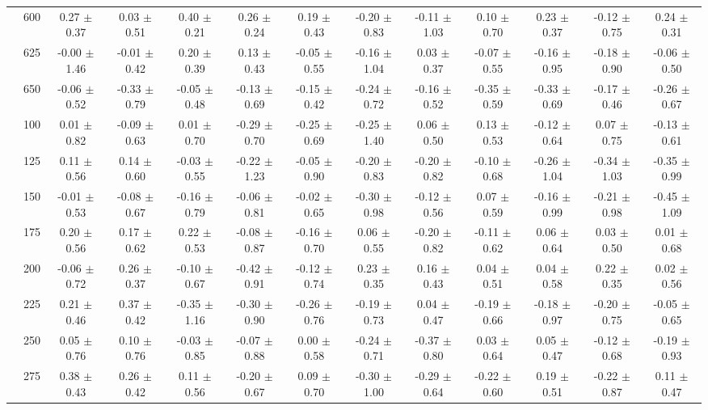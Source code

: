 \begin{table}[h]
{\begin{tabular}{
        ccccccccccccc}
 & 600& 0.27 $\pm$ 0.37& 0.03 $\pm$ 0.51& 0.40 $\pm$ 0.21& 0.26 $\pm$ 0.24& 0.19 $\pm$ 0.43& -0.20 $\pm$ 0.83& -0.11 $\pm$ 1.03& 0.10 $\pm$ 0.70& 0.23 $\pm$ 0.37& -0.12 $\pm$ 0.75& 0.24 $\pm$ 0.31 \\ 
 & 625& -0.00 $\pm$ 1.46& -0.01 $\pm$ 0.42& 0.20 $\pm$ 0.39& 0.13 $\pm$ 0.43& -0.05 $\pm$ 0.55& -0.16 $\pm$ 1.04& 0.03 $\pm$ 0.37& -0.07 $\pm$ 0.55& -0.16 $\pm$ 0.95& -0.18 $\pm$ 0.90& -0.06 $\pm$ 0.50 \\ 
 & 650& -0.06 $\pm$ 0.52& -0.33 $\pm$ 0.79& -0.05 $\pm$ 0.48& -0.13 $\pm$ 0.69& -0.15 $\pm$ 0.42& -0.24 $\pm$ 0.72& -0.16 $\pm$ 0.52& -0.35 $\pm$ 0.59& -0.33 $\pm$ 0.69& -0.17 $\pm$ 0.46& -0.26 $\pm$ 0.67 \\ \hline 
 & 100& 0.01 $\pm$ 0.82& -0.09 $\pm$ 0.63& 0.01 $\pm$ 0.70& -0.29 $\pm$ 0.70& -0.25 $\pm$ 0.69& -0.25 $\pm$ 1.40& 0.06 $\pm$ 0.50& 0.13 $\pm$ 0.53& -0.12 $\pm$ 0.64& 0.07 $\pm$ 0.75& -0.13 $\pm$ 0.61 \\ 
 & 125& 0.11 $\pm$ 0.56& 0.14 $\pm$ 0.60& -0.03 $\pm$ 0.55& -0.22 $\pm$ 1.23& -0.05 $\pm$ 0.90& -0.20 $\pm$ 0.83& -0.20 $\pm$ 0.82& -0.10 $\pm$ 0.68& -0.26 $\pm$ 1.04& -0.34 $\pm$ 1.03& -0.35 $\pm$ 0.99 \\ 
 & 150& -0.01 $\pm$ 0.53& -0.08 $\pm$ 0.67& -0.16 $\pm$ 0.79& -0.06 $\pm$ 0.81& -0.02 $\pm$ 0.65& -0.30 $\pm$ 0.98& -0.12 $\pm$ 0.56& 0.07 $\pm$ 0.59& -0.16 $\pm$ 0.99& -0.21 $\pm$ 0.98& -0.45 $\pm$ 1.09 \\ 
 & 175& 0.20 $\pm$ 0.56& 0.17 $\pm$ 0.62& 0.22 $\pm$ 0.53& -0.08 $\pm$ 0.87& -0.16 $\pm$ 0.70& 0.06 $\pm$ 0.55& -0.20 $\pm$ 0.82& -0.11 $\pm$ 0.62& 0.06 $\pm$ 0.64& 0.03 $\pm$ 0.50& 0.01 $\pm$ 0.68 \\ 
 & 200& -0.06 $\pm$ 0.72& 0.26 $\pm$ 0.37& -0.10 $\pm$ 0.67& -0.42 $\pm$ 0.91& -0.12 $\pm$ 0.74& 0.23 $\pm$ 0.35& 0.16 $\pm$ 0.43& 0.04 $\pm$ 0.51& 0.04 $\pm$ 0.58& 0.22 $\pm$ 0.35& 0.02 $\pm$ 0.56 \\ 
 & 225& 0.21 $\pm$ 0.46& 0.37 $\pm$ 0.42& -0.35 $\pm$ 1.16& -0.30 $\pm$ 0.90& -0.26 $\pm$ 0.76& -0.19 $\pm$ 0.73& 0.04 $\pm$ 0.47& -0.19 $\pm$ 0.66& -0.18 $\pm$ 0.97& -0.20 $\pm$ 0.75& -0.05 $\pm$ 0.65 \\ 
 & 250& 0.05 $\pm$ 0.76& 0.10 $\pm$ 0.76& -0.03 $\pm$ 0.85& -0.07 $\pm$ 0.88& 0.00 $\pm$ 0.58& -0.24 $\pm$ 0.71& -0.37 $\pm$ 0.80& 0.03 $\pm$ 0.64& 0.05 $\pm$ 0.47& -0.12 $\pm$ 0.68& -0.19 $\pm$ 0.93 \\ 
 & 275& 0.38 $\pm$ 0.43& 0.26 $\pm$ 0.42& 0.11 $\pm$ 0.56& -0.20 $\pm$ 0.67& 0.09 $\pm$ 0.70& -0.30 $\pm$ 1.00& -0.29 $\pm$ 0.64& -0.22 $\pm$ 0.60& 0.19 $\pm$ 0.51& -0.22 $\pm$ 0.87& 0.11 $\pm$ 0.47 \\ 

\end{tabular}}
\end{table}

